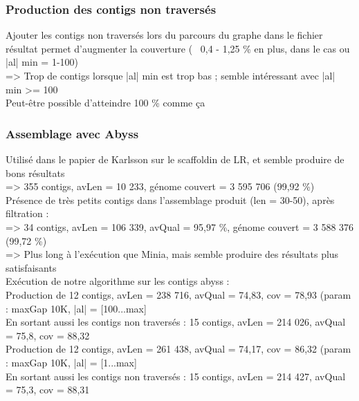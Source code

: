 \documentclass[12pt]{article}
\begin{document}
\subsubsection{Production des contigs non traversés}

Ajouter les contigs non traversés lors du parcours du graphe dans le fichier résultat permet
d'augmenter la couverture (~ 0,4 - 1,25 \% en plus, dans le cas ou |al| min = 1-100) \\

=> Trop de contigs lorsque |al| min est trop bas ; semble intéressant avec |al| min >= 100 \\

Peut-être possible d'atteindre 100 \% comme ça

\subsubsection{Assemblage avec Abyss}

Utilisé dans le papier de Karlsson sur le scaffoldin de LR, et semble produire de bons résultats \\

=> 355 contigs, avLen = 10 233, génome couvert = 3 595 706 (99,92 \%) \\

Présence de très petits contigs dans l'assemblage produit (len = 30-50), après filtration : \\

=> 34 contigs, avLen = 106 339, avQual = 95,97 \%,  génome couvert = 3 588 376 (99,72 \%) \\ 

=> Plus long à l'exécution que Minia, mais semble produire des résultats plus satisfaisants \\ 

Exécution de notre algorithme sur les contigs abyss : \\

Production de 12 contigs, avLen = 238 716, avQual = 74,83, cov = 78,93 (param : maxGap 10K, |al| = [100...max] \\
En sortant aussi les contigs non traversés : 15 contigs, avLen = 214 026, avQual = 75,8, cov = 88,32 \\

Production de 12 contigs, avLen = 261 438, avQual = 74,17, cov = 86,32 (param : maxGap 10K, |al| = [1...max] \\
En sortant aussi les contigs non traversés : 15 contigs, avLen = 214 427, avQual = 75,3, cov = 88,31 \\
\end{document}
